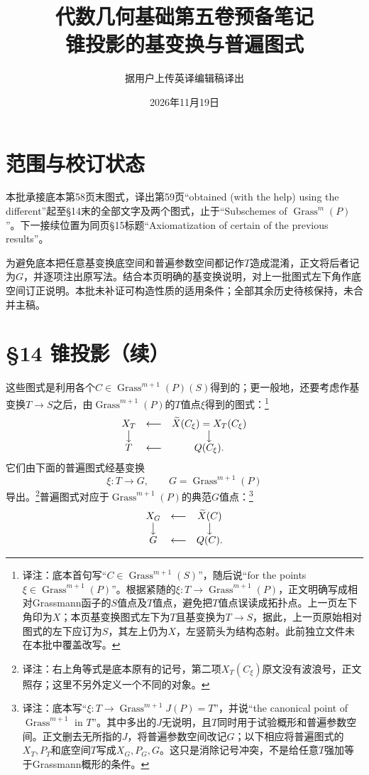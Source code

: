 \documentclass[openany,fontset=fandol]{ctexbook}
\newcommand{\note}[1]{\unskip\nobreak\footnote{译注：#1}}
\begin{document}
\title{代数几何基础第五卷预备笔记\\锥投影的基变换与普遍图式}
\author{据用户上传英译编辑稿译出}
\date{2026年11月19日}
\maketitle
\chapter*{范围与校订状态}
本批承接底本第58页末图式，译出第59页“obtained (with the help) using the different”起至§14末的全部文字及两个图式，止于“Subschemes of $\operatorname{Grass}^m(P)$”。下一接续位置为同页§15标题“Axiomatization of certain of the previous results”。

为避免底本把任意基变换底空间和普遍参数空间都记作$T$造成混淆，正文将后者记为$G$，并逐项注出原写法。结合本页明确的基变换说明，对上一批图式左下角作底空间订正说明。本批未补证可构造性质的适用条件；全部其余历史待核保持，未合并主稿。
\chapter*{§14 锥投影（续）}
这些图式是利用各个$C\in\operatorname{Grass}^{m+1}(P)(S)$得到的；更一般地，还要考虑作基变换$T\to S$之后，由$\operatorname{Grass}^{m+1}(P)$的$T$值点$\xi$得到的图式：\note{底本首句写“$C\in\operatorname{Grass}^{m+1}(S)$”，随后说“for the points $\xi\in\operatorname{Grass}^{m+1}(P)$”。根据紧随的$\xi:T\to\operatorname{Grass}^{m+1}(P)$，正文明确写成相对Grassmann函子的$S$值点及$T$值点，避免把$T$值点误读成拓扑点。上一页左下角印为$X$；本页基变换图式左下为$T$且基变换为$T\to S$，据此，上一页原始相对图式的左下应订为$S$，其左上仍为$X$，左竖箭头为结构态射。此前独立文件未在本批中覆盖改写。}
\[
\begin{array}{ccc}
X_T&\longleftarrow&\widetilde X(C_\xi)=X_T(C_\xi)\\
\big\downarrow&&\big\downarrow\\
T&\longleftarrow&Q(C_\xi).
\end{array}
\]
它们由下面的普遍图式经基变换
\[
\xi:T\longrightarrow G,\qquad G=\operatorname{Grass}^{m+1}(P)
\]
导出。\note{右上角等式是底本原有的记号，第二项$X_T(C_\xi)$原文没有波浪号，正文照存；这里不另外定义一个不同的对象。}普遍图式对应于$\operatorname{Grass}^{m+1}(P)$的典范$G$值点：\note{底本写“$\xi:T\to\operatorname{Grass}^{m+1}J(P)=T$”，并说“the canonical point of $\operatorname{Grass}^{m+1}$ in $T$”。其中多出的$J$无说明，且$T$同时用于试验概形和普遍参数空间。正文删去无所指的$J$，将普遍参数空间改记$G$；以下相应将普遍图式的$X_T,P_T$和底空间$T$写成$X_G,P_G,G$。这只是消除记号冲突，不是给任意$T$强加等于Grassmann概形的条件。}
\[
\begin{array}{ccc}
X_G&\longleftarrow&\widetilde X(C)\\
\big\downarrow&&\big\downarrow\\
G&\longleftarrow&Q(C).
\end{array}
\]
\end{document}
